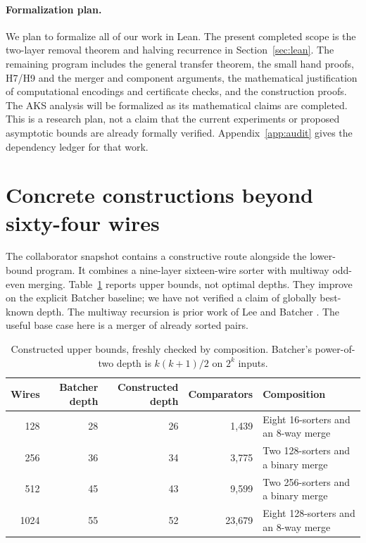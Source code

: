\documentclass[11pt]{article}
\begin{document}
\paragraph{Formalization plan.}
We plan to formalize all of our work in Lean. The present completed scope is the two-layer removal theorem and halving recurrence in Section~\ref{sec:lean}. The remaining program includes the general transfer theorem, the small hand proofs, H7/H9 and the merger and component arguments, the mathematical justification of computational encodings and certificate checks, and the construction proofs. The AKS analysis will be formalized as its mathematical claims are completed. This is a research plan, not a claim that the current experiments or proposed asymptotic bounds are already formally verified. Appendix~\ref{app:audit} gives the dependency ledger for that work.

\section{Concrete constructions beyond sixty-four wires}\label{sec:construction}
The collaborator snapshot contains a constructive route alongside the lower-bound program. It combines a nine-layer sixteen-wire sorter with multiway odd-even merging. Table~\ref{tab:upper} reports upper bounds, not optimal depths. They improve on the explicit Batcher baseline; we have not verified a claim of globally best-known depth. The multiway recursion is prior work of Lee and Batcher \cite{leebatcher}. The useful base case here is a merger of already sorted pairs.

\begin{table}[ht]
\centering
\small
\begin{tabular}{rrrrl}
\toprule Wires & Batcher depth & Constructed depth & Comparators & Composition\\\midrule
128 & 28 & 26 & 1,439 & Eight 16-sorters and an 8-way merge\\
256 & 36 & 34 & 3,775 & Two 128-sorters and a binary merge\\
512 & 45 & 43 & 9,599 & Two 256-sorters and a binary merge\\
1024 & 55 & 52 & 23,679 & Eight 128-sorters and an 8-way merge\\\bottomrule
\end{tabular}
\caption{Constructed upper bounds, freshly checked by composition. Batcher's power-of-two depth is $k(k+1)/2$ on $2^k$ inputs.}\label{tab:upper}
\end{table}
\end{document}
